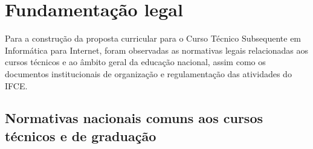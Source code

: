 \documentclass[
	12pt,				%
	openright,			%
	twoside,			%
	a4paper,			%
	chapter=TITLE,		%
	english,			%
	french,				%
	spanish,			%
	brazil,				%
	]{abntex2}
\begin{document}
\textual


\normalsize


	

\chapter{Fundamentação legal}
Para a construção da proposta curricular para o Curso Técnico Subsequente em Informática para Internet, foram observadas as normativas legais relacionadas aos cursos técnicos e ao âmbito geral da educação nacional, assim como os documentos institucionais de organização e regulamentação das atividades do IFCE.

\section{Normativas nacionais comuns aos cursos técnicos e de graduação}
\end{document}

